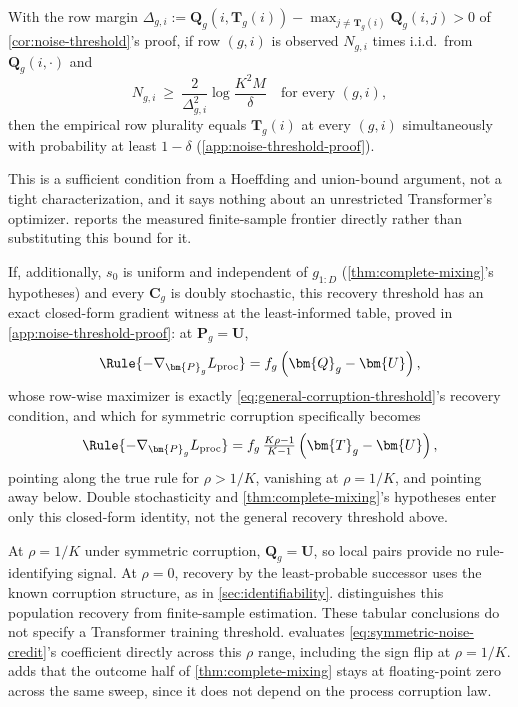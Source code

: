 \begin{proposition}
\label{prop:finite-sample-recovery}
With the row margin $\Delta_{g,i}:=\bm{Q}_g(i,\bm{T}_g(i))-\max_{j\ne \bm{T}_g(i)}\bm{Q}_g(i,j)>0$
of \cref{cor:noise-threshold}'s proof, if row $(g,i)$ is observed $N_{g,i}$
times i.i.d.\ from $\bm{Q}_g(i,\cdot)$ and
\begin{equation}
 N_{g,i}\ \ge\ \frac{2}{\Delta_{g,i}^2}\log\frac{K^2M}{\delta}
 \quad\text{for every }(g,i),
 \label{eq:finite-sample-recovery}
\end{equation}
then the empirical row plurality equals $\bm{T}_g(i)$ at every $(g,i)$
simultaneously with probability at least $1-\delta$
(\cref{app:noise-threshold-proof}).
\end{proposition}

This is a sufficient condition from a Hoeffding and union-bound argument,
not a tight characterization, and it says nothing about an unrestricted
Transformer's optimizer.  reports the measured
finite-sample frontier directly rather than substituting this bound for it.

If, additionally, $s_0$ is uniform and independent of $g_{1:D}$
(\cref{thm:complete-mixing}'s hypotheses) and every $\bm{C}_g$ is doubly
stochastic, this recovery threshold has an exact closed-form gradient
witness at the least-informed table, proved in
\cref{app:noise-threshold-proof}: at $\bm{P}_g=\bm{U}$,
\begin{equation}
 \Rule{-\nabla_{\bm{P}_g}L_{\rm proc}}=f_g\left(\bm{Q}_g-\bm{U}\right),
 \label{eq:noisy-process-credit}
\end{equation}
whose row-wise maximizer is exactly \cref{eq:general-corruption-threshold}'s
recovery condition, and which for symmetric corruption specifically
becomes
\begin{equation}
 \Rule{-\nabla_{\bm{P}_g}L_{\rm proc}}=f_g\,\tfrac{K\rho-1}{K-1}\left(\bm{T}_g-\bm{U}\right),
 \label{eq:symmetric-noise-credit}
\end{equation}
pointing along the true rule for
$\rho>1/K$, vanishing at $\rho=1/K$, and pointing away below. Double
stochasticity and \cref{thm:complete-mixing}'s hypotheses enter only this
closed-form identity, not the general recovery threshold above.

At $\rho=1/K$ under symmetric corruption, $\bm{Q}_g=\bm{U}$, so local pairs provide no
rule-identifying signal. At $\rho=0$, recovery by the least-probable successor
uses the known corruption structure, as in \cref{sec:identifiability}.
 distinguishes this population recovery from
finite-sample estimation. These tabular conclusions do not specify a
Transformer training threshold.
 evaluates \cref{eq:symmetric-noise-credit}'s
coefficient directly across this $\rho$ range, including the sign flip at
$\rho=1/K$.  adds that the outcome half of
\cref{thm:complete-mixing} stays at floating-point zero across the same
sweep, since it does not depend on the process corruption law.

